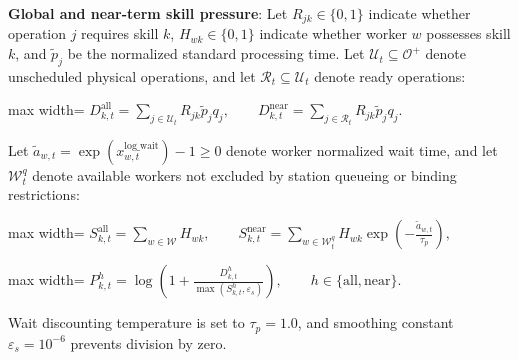 \documentclass[journal,10pt]{IEEEtran}
\begin{document}
\textbf{Global and near-term skill pressure}:
Let $R_{jk}\in\{0,1\}$ indicate whether operation $j$ requires skill $k$, $H_{wk}\in\{0,1\}$ indicate whether worker $w$ possesses skill $k$, and $\widetilde p_j$ be the normalized standard processing time. Let $\mathcal U_t\subseteq\mathcal O^+$ denote unscheduled physical operations, and let $\mathcal R_t\subseteq\mathcal U_t$ denote ready operations:
\begin{center}
\begin{adjustbox}{max width=\columnwidth}
$\displaystyle
D_{k,t}^{\mathrm{all}} = \sum_{j\in\mathcal U_t} R_{jk}\widetilde p_j q_j, \qquad D_{k,t}^{\mathrm{near}} = \sum_{j\in\mathcal R_t} R_{jk}\widetilde p_j q_j.
$
\end{adjustbox}
\end{center}
Let $\widetilde a_{w,t} = \exp(x_{w,t}^{\mathrm{log\_wait}}) - 1 \ge 0$ denote worker normalized wait time, and let $\mathcal W_t^q$ denote available workers not excluded by station queueing or binding restrictions:
\begin{center}
\begin{adjustbox}{max width=\columnwidth}
$\displaystyle
S_{k,t}^{\mathrm{all}} = \sum_{w\in\mathcal W} H_{wk}, \qquad S_{k,t}^{\mathrm{near}} = \sum_{w\in\mathcal W_t^q} H_{wk}\exp\!\left(-\frac{\widetilde a_{w,t}}{\tau_p}\right),
$
\end{adjustbox}
\end{center}
\begin{center}
\begin{adjustbox}{max width=\columnwidth}
$\displaystyle
P_{k,t}^h = \log\!\left(1 + \frac{D_{k,t}^h}{\max(S_{k,t}^h, \varepsilon_s)}\right), \qquad h\in\{\mathrm{all},\mathrm{near}\}.
$
\end{adjustbox}
\end{center}
Wait discounting temperature is set to $\tau_p=1.0$, and smoothing constant $\varepsilon_s=10^{-6}$ prevents division by zero.
\end{document}
